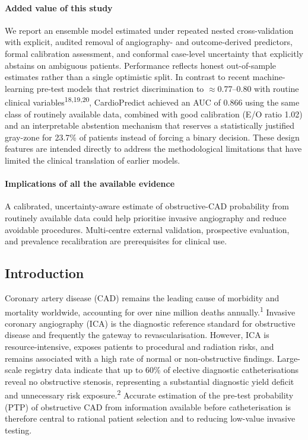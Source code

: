 \documentclass[
  english,
  11pt,
]{article}
\begin{document}
\paragraph{Added value of this study}\label{added-value-of-this-study}

We report an ensemble model estimated under repeated nested
cross-validation with explicit, audited removal of angiography- and
outcome-derived predictors, formal calibration assessment, and conformal
case-level uncertainty that explicitly abstains on ambiguous patients.
Performance reflects honest out-of-sample estimates rather than a single
optimistic split. In contrast to recent machine-learning pre-test models
that restrict discrimination to \(\approx\)0.77--0.80 with routine clinical
variables\textsuperscript{18,19,20}, CardioPredict achieved an AUC of 0.866 using
the same class of routinely available data, combined with good
calibration (E/O ratio 1.02) and an interpretable abstention mechanism
that reserves a statistically justified gray-zone for 23.7\% of patients
instead of forcing a binary decision. These design features are intended
directly to address the methodological limitations that have limited the
clinical translation of earlier models.

\paragraph{Implications of all the available
evidence}\label{implications-of-all-the-available-evidence}

A calibrated, uncertainty-aware estimate of obstructive-CAD probability
from routinely available data could help prioritise invasive angiography
and reduce avoidable procedures. Multi-centre external validation,
prospective evaluation, and prevalence recalibration are prerequisites
for clinical use.

\subsection{Introduction}\label{introduction}

Coronary artery disease (CAD) remains the leading cause of morbidity and mortality worldwide, accounting for over nine million deaths annually.\textsuperscript{1} Invasive coronary angiography (ICA) is the diagnostic reference standard for obstructive disease and frequently the gateway to revascularisation. However, ICA is resource-intensive, exposes patients to procedural and radiation risks, and remains associated with a high rate of normal or non-obstructive findings. Large-scale registry data indicate that up to 60\% of elective diagnostic catheterisations reveal no obstructive stenosis, representing a substantial diagnostic yield deficit and unnecessary risk exposure.\textsuperscript{2} Accurate estimation of the pre-test probability (PTP) of obstructive CAD from information available before catheterisation is therefore central to rational patient selection and to reducing low-value invasive testing.
\end{document}
